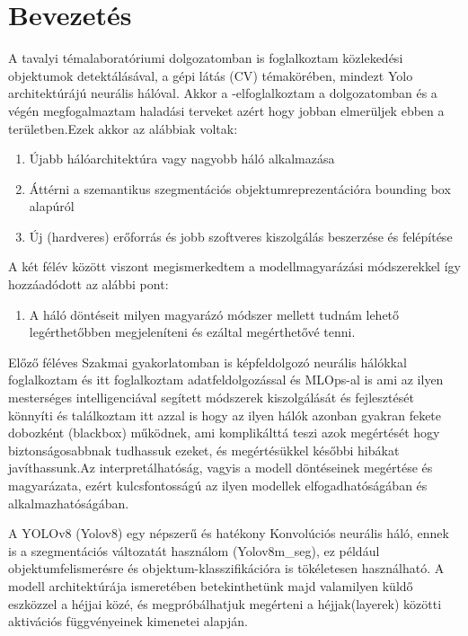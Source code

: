 \documentclass[12pt,oneside,a4paper]{article}
\title{\titletext}
\author{Nyilas Péter}
\date{\today}
\newcommand{\newsection}[1]{\clearpage\section{#1}}\label{makro}
\theoremstyle{remark}
\begin{document}
\maketitle
\newpage
\tableofcontents\label{ossz:tartalomjegyzek}
\newpage
\newsection{Bevezetés}\label{sec:bevezetes}
\pagestyle{fancy}
    A tavalyi témalaboratóriumi dolgozatomban is foglalkoztam közlekedési objektumok detektálásával,
    a gépi látás (\ac{CV}) témakörében, mindezt Yolo architektúrájú neurális hálóval. Akkor a
-elfoglalkoztam a dolgozatomban és a végén megfogalmaztam haladási terveket azért hogy jobban elmerüljek ebben a területben.Ezek akkor az alábbiak voltak:
\begin{enumerate}[label=\alph*., start=1]\label{enum:tervek}
    \item Újabb hálóarchitektúra vagy nagyobb háló alkalmazása
    \item Áttérni a szemantikus szegmentációs objektumreprezentációra bounding box alapúról
    \item Új (hardveres) erőforrás és jobb szoftveres kiszolgálás beszerzése és felépítése
\end{enumerate}
A két félév között viszont megismerkedtem a modellmagyarázási módszerekkel így hozzáadódott az alábbi pont:
\begin{enumerate}[label=\alph*., start=3]
    \item A háló döntéseit milyen magyarázó módszer mellett tudnám lehető legérthetőbben megjeleníteni és ezáltal megérthetővé tenni.
\end{enumerate}

    Előző féléves Szakmai gyakorlatomban is képfeldolgozó neurális hálókkal foglalkoztam és itt foglalkoztam adatfeldolgozással és MLOps-al is ami az ilyen mesterséges intelligenciával segített módszerek kiszolgálását és fejlesztését könnyíti és találkoztam itt azzal is hogy az ilyen
    hálók azonban gyakran fekete dobozként (blackbox) működnek, ami komplikálttá teszi azok megértését  hogy biztonságosabbnak tudhassuk ezeket,
    és megértésükkel későbbi hibákat javíthassunk.Az interpretálhatóság, vagyis a modell döntéseinek megértése
    és magyarázata, ezért kulcsfontosságú az ilyen modellek elfogadhatóságában és alkalmazhatóságában.

    A YOLOv8 (\gls{Yolov8}) egy népszerű és hatékony Konvolúciós neurális háló,
    ennek is a szegmentációs változatát használom (Yolov8m\_seg), ez
    például objektumfelismerésre és objektum-klasszifikációra is tökéletesen használható.
    A modell architektúrája ismeretében betekinthetünk majd valamilyen küldő eszközzel a héjjai közé, és megpróbálhatjuk megérteni a héjjak(layerek) közötti aktivációs függvényeinek kimenetei alapján.
\end{document}
